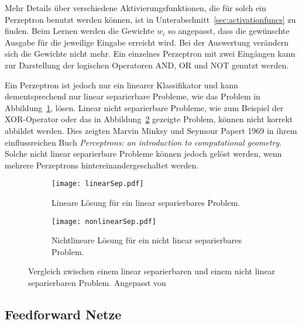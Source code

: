 Mehr Details über verschiedene Aktivierungsfunktionen, die für solch ein Perzeptron benutzt werden können, ist in Unterabschnitt~\ref{sec:activationfuncs} zu finden.
Beim Lernen werden die Gewichte \(w_i\) so angepasst, dass die gewünschte Ausgabe für die jeweilige Eingabe erreicht wird.
Bei der Auswertung verändern sich die Gewichte nicht mehr.
Ein einzelnes Perzeptron mit zwei Eingängen kann zur Darstellung der logischen Operatoren AND, OR und NOT genutzt werden.

Ein Perzeptron ist jedoch nur ein linearer Klassifikator und kann dementsprechend nur linear separierbare Probleme, wie das Problem in Abbildung~\ref{subfig:linearSep}, lösen.
Linear nicht separierbare Probleme, wie zum Beispiel der XOR-Operator oder das in Abbildung~\ref{subfig:nonlinearSep} gezeigte Problem, können nicht korrekt abbildet werden.
Dies zeigten Marvin Minksy und Seymour Papert 1969 in ihrem einflussreichen Buch \textit{Perceptrons: an introduction to computational geometry}. 
Solche nicht linear separierbare Probleme können jedoch gelöst werden, wenn mehrere Perzeptrons hintereinandergeschaltet werden.


\begin{figure}[h]
	\centering
	\begin{subfigure}[t]{0.4\textwidth}
		\texttt{[image: linearSep.pdf]}
		\caption{Lineare Lösung für ein linear separierbares Problem.}
		\label{subfig:linearSep}
	\end{subfigure}
	\quad
	\begin{subfigure}[t]{0.4\textwidth}
		\texttt{[image: nonlinearSep.pdf]}
		\caption{Nichtlineare Lösung für ein nicht linear separierbares Problem.}
		\label{subfig:nonlinearSep}
	\end{subfigure}
	\caption{Vergleich zwischen einem linear separierbaren und einem nicht linear separierbaren Problem. Angepasst von \cite{LinSep}}
	\label{fig:linearNonlinearVgl}
\end{figure}

\subsection{Feedforward Netze}

